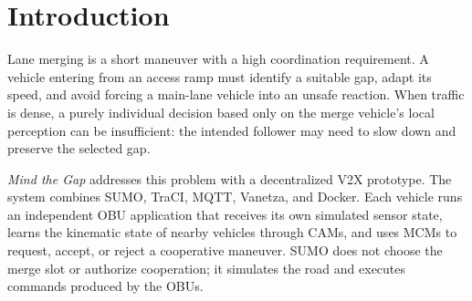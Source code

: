 \documentclass[a4paper,12pt]{article}
\begin{document}
\begin{abstract}
This report presents a software-in-the-loop prototype for decentralized V2X lane merging. Each simulated vehicle is represented by an independent On-Board Unit (OBU) that combines local sensor data with Cooperative Awareness Messages (CAMs) and Maneuver Coordination Messages (MCMs). The OBU estimates time of arrival to a fixed merge point, identifies a lead vehicle and a cooperative host, negotiates a temporal gap, checks safety conditions, and publishes speed and lane commands. SUMO provides the road and vehicle dynamics, while a Python TraCI bridge translates MQTT actuator messages into physical simulation actions and returns execution feedback. The implementation separates logical authorization from physical lane-change execution through the states \texttt{WAIT\_EDGE}, \texttt{APPLY}, and \texttt{CLEAR}. A representative \texttt{single-lane} demonstration shows host rejection and reselection, successful MCM acceptance, delayed lane availability, physical merge execution, rear-gap protection, and a clean completion.
\end{abstract}

\tableofcontents
\newpage
{}

\section{Introduction}

Lane merging is a short maneuver with a high coordination requirement. A vehicle entering from an access ramp must identify a suitable gap, adapt its speed, and avoid forcing a main-lane vehicle into an unsafe reaction. When traffic is dense, a purely individual decision based only on the merge vehicle's local perception can be insufficient: the intended follower may need to slow down and preserve the selected gap.

\textit{Mind the Gap} addresses this problem with a decentralized V2X prototype. The system combines SUMO, TraCI, MQTT, Vanetza, and Docker. Each vehicle runs an independent OBU application that receives its own simulated sensor state, learns the kinematic state of nearby vehicles through CAMs, and uses MCMs to request, accept, or reject a cooperative maneuver. SUMO does not choose the merge slot or authorize cooperation; it simulates the road and executes commands produced by the OBUs.
\end{document}
